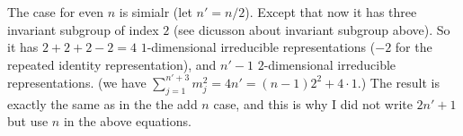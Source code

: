 The case for even $n$ is simialr (let $n'=n/2$). Except that now it
has three invariant subgroup of index $2$ (see dicusson about invariant
subgroup above). So it has $2+2+2-2=4$ $1$-dimensional irreducible
representations ($-2$ for the repeated identity representation), and
$n'-1$ $2$-dimensional irreducible representations.
(we have $\sum_{j=1}^{n'+3}m_j^2 = 4n' = (n-1)2^2 + 4\cdot 1$.)
The result is exactly the same as in the the add $n$ case, and this is
why I did not write $2n'+1$ but use $n$ in the above equations.

